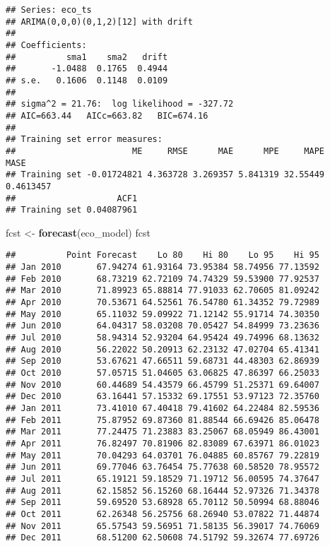 \documentclass[
]{article}
\newenvironment{Shaded}{\begin{snugshade}}{\end{snugshade}}
\newcommand{\FunctionTok}[1]{\textcolor[rgb]{0.13,0.29,0.53}{\textbf{#1}}}
\newcommand{\NormalTok}[1]{#1}
\newcommand{\OtherTok}[1]{\textcolor[rgb]{0.56,0.35,0.01}{#1}}
\begin{document}
\begin{verbatim}
## Series: eco_ts 
## ARIMA(0,0,0)(0,1,2)[12] with drift 
## 
## Coefficients:
##          sma1    sma2   drift
##       -1.0488  0.1765  0.4944
## s.e.   0.1606  0.1148  0.0109
## 
## sigma^2 = 21.76:  log likelihood = -327.72
## AIC=663.44   AICc=663.82   BIC=674.16
## 
## Training set error measures:
##                       ME     RMSE      MAE      MPE     MAPE      MASE
## Training set -0.01724821 4.363728 3.269357 5.841319 32.55449 0.4613457
##                    ACF1
## Training set 0.04087961
\end{verbatim}

\begin{Shaded}
\begin{Highlighting}[]
\NormalTok{fcst }\OtherTok{\textless{}{-}} \FunctionTok{forecast}\NormalTok{(eco\_model)}
\NormalTok{fcst}
\end{Highlighting}
\end{Shaded}

\begin{verbatim}
##          Point Forecast    Lo 80    Hi 80    Lo 95    Hi 95
## Jan 2010       67.94274 61.93164 73.95384 58.74956 77.13592
## Feb 2010       68.73219 62.72109 74.74329 59.53900 77.92537
## Mar 2010       71.89923 65.88814 77.91033 62.70605 81.09242
## Apr 2010       70.53671 64.52561 76.54780 61.34352 79.72989
## May 2010       65.11032 59.09922 71.12142 55.91714 74.30350
## Jun 2010       64.04317 58.03208 70.05427 54.84999 73.23636
## Jul 2010       58.94314 52.93204 64.95424 49.74996 68.13632
## Aug 2010       56.22022 50.20913 62.23132 47.02704 65.41341
## Sep 2010       53.67621 47.66511 59.68731 44.48303 62.86939
## Oct 2010       57.05715 51.04605 63.06825 47.86397 66.25033
## Nov 2010       60.44689 54.43579 66.45799 51.25371 69.64007
## Dec 2010       63.16441 57.15332 69.17551 53.97123 72.35760
## Jan 2011       73.41010 67.40418 79.41602 64.22484 82.59536
## Feb 2011       75.87952 69.87360 81.88544 66.69426 85.06478
## Mar 2011       77.24475 71.23883 83.25067 68.05949 86.43001
## Apr 2011       76.82497 70.81906 82.83089 67.63971 86.01023
## May 2011       70.04293 64.03701 76.04885 60.85767 79.22819
## Jun 2011       69.77046 63.76454 75.77638 60.58520 78.95572
## Jul 2011       65.19121 59.18529 71.19712 56.00595 74.37647
## Aug 2011       62.15852 56.15260 68.16444 52.97326 71.34378
## Sep 2011       59.69520 53.68928 65.70112 50.50994 68.88046
## Oct 2011       62.26348 56.25756 68.26940 53.07822 71.44874
## Nov 2011       65.57543 59.56951 71.58135 56.39017 74.76069
## Dec 2011       68.51200 62.50608 74.51792 59.32674 77.69726
\end{verbatim}
\end{document}
